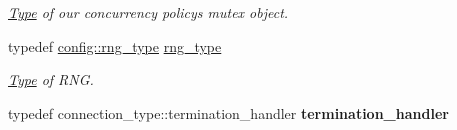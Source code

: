 \begin{DoxyCompactItemize}
\begin{DoxyCompactList}\small\item\em \mbox{\hyperlink{struct_type}{Type}} of our concurrency policy\textquotesingle{}s mutex object. \end{DoxyCompactList}\item 
\mbox{\label{classwebsocketpp_1_1endpoint_adbb0a9eea3ebbf5139966858bd0fa16d}} 
typedef \mbox{\hyperlink{classwebsocketpp_1_1random_1_1none_1_1int__generator}{config\+::rng\+\_\+type}} \mbox{\hyperlink{classwebsocketpp_1_1endpoint_adbb0a9eea3ebbf5139966858bd0fa16d}{rng\+\_\+type}}
\begin{DoxyCompactList}\small\item\em \mbox{\hyperlink{struct_type}{Type}} of R\+NG. \end{DoxyCompactList}\item 
\mbox{\label{classwebsocketpp_1_1endpoint_a24710dbab3b51673b5459b7b609d5d66}} 
typedef connection\+\_\+type\+::termination\+\_\+handler {\bfseries termination\+\_\+handler}
\end{DoxyCompactItemize}
